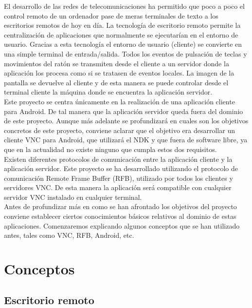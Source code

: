 
El desarrollo de las redes de telecomunicaciones ha permitido que poco a poco el control remoto de un ordenador pase de meras terminales de texto a los escritorios remotos de hoy en día. La tecnología de escritorio remoto permite la centralización de aplicaciones que normalmente se ejecutarían en el entorno de usuario. Gracias a esta tecnología el entorno de usuario (cliente) se convierte en una simple terminal de entrada/salida. Todos los eventos de pulsación de teclas y movimientos del ratón se transmiten desde el cliente a un servidor donde la aplicación los procesa como si se tratasen de eventos locales. La imagen de la pantalla se devuelve al cliente y de esta manera se puede controlar desde el terminal cliente la máquina donde se encuentra la aplicación servidor.\\

Este proyecto se centra únicamente en la realización de una aplicación cliente para Android. De tal manera que la aplicación servidor queda fuera del dominio de este proyecto. Aunque más adelante se profundizará en cuales son los objetivos concretos de este proyecto, conviene aclarar que el objetivo era desarrollar un cliente VNC para Android, que utilizará el NDK y que fuera de software libre, ya que en la actualidad no existe ninguno que cumpla estos dos requisitos.\\

Existen diferentes protocolos de comunicación entre la aplicación cliente y la aplicación servidor. Este proyecto se ha desarrollado utilizando el protocolo de comunicación Remote Frame Buffer (RFB), utilizado por todos los clientes y servidores VNC. De esta manera la aplicación será compatible con cualquier servidor VNC instalado en cualquier terminal.\\

Antes de profundizar más en como se han afrontado los objetivos del proyecto conviene establecer ciertos conocimientos básicos relativos al dominio de estas aplicaciones. Comenzaremos explicando algunos conceptos que se han utilizado antes, tales como VNC, RFB, Android, etc.\\

\section{Conceptos}

\subsection{Escritorio remoto}

